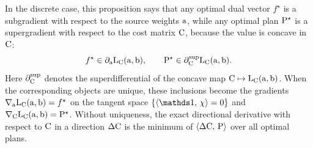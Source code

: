 In the discrete case, this proposition says that any optimal dual vector $f^\star$ is a subgradient with respect to the source weights $\a$, while any optimal plan $\P^\star$ is a supergradient with respect to the cost matrix $\C$, because the value is concave in $\C$:
\[
	f^\star\in\partial_{\a}\MKD_{\C}(\a,\b),
	\qquad
	\P^\star\in\partial_{\C}^{\mathrm{sup}}\MKD_{\C}(\a,\b).
\]
Here $\partial_{\C}^{\mathrm{sup}}$ denotes the superdifferential of the concave map $\C\mapsto\MKD_{\C}(\a,\b)$. When the corresponding objects are unique, these inclusions become the gradients $\nabla_{\a}\MKD_{\C}(\a,\b)=f^\star$ on the tangent space $\{\dotp{\ones}{\chi}=0\}$ and $\nabla_{\C}\MKD_{\C}(\a,\b)=\P^\star$. Without uniqueness, the exact directional derivative with respect to $\C$ in a direction $\Delta\C$ is the minimum of $\dotp{\Delta\C}{\P}$ over all optimal plans.

